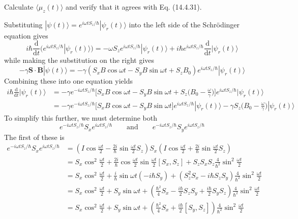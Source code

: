 \documentclass[../principles-of-quantum-mechanics.tex]{subfiles}
\begin{document}
\begin{questions}
		Calculate $\langle \mu_z(t)\rangle$ and verify that it agrees with Eq. (14.4.31).
		
		\begin{solution}
			Substituting $|\psi(t)\rangle = e^{i\omega tS_z/\hbar}|\psi_r(t)\rangle$ into the left side of the Schr\"odinger equation gives
			$$i\hbar\frac{\mathrm{d}}{\mathrm{d}t}\Big(e^{i\omega tS_z/\hbar}|\psi_r(t)\rangle\Big) = -\omega S_ze^{i\omega tS_z/\hbar}|\psi_r(t)\rangle + i\hbar e^{i\omega tS_z/\hbar}\frac{\mathrm{d}}{\mathrm{d}t}|\psi_r(t)\rangle$$
			while making the substitution on the right gives
			$$-\gamma\mathbf{S}\cdot\mathbf{B}|\psi(t)\rangle = -\gamma(S_xB\cos\omega t - S_yB\sin\omega t + S_zB_0)e^{i\omega tS_z/\hbar}|\psi_r(t)\rangle$$
			Combining these into one equation yields
			\begin{align*}
				i\hbar\frac{\mathrm{d}}{\mathrm{d}t}|\psi_r(t)\rangle &= -\gamma e^{-i\omega tS_z/\hbar}\Big[S_xB\cos\omega t - S_yB\sin\omega t + S_z\Big(B_0 - \frac{\omega}{\gamma}\Big)\Big]e^{i\omega tS_z/\hbar}|\psi_r(t)\rangle \\
				&= -\gamma e^{-i\omega tS_z/\hbar}\Big[S_xB\cos\omega t - S_yB\sin\omega t\Big]e^{i\omega tS_z/\hbar}|\psi_r(t)\rangle - \gamma S_z\Big(B_0 - \frac{\omega}{\gamma}\Big)|\psi_r(t)\rangle
			\end{align*}
			To simplify this further, we must determine both
			$$e^{-i\omega tS_z/\hbar}S_xe^{i\omega tS_z/\hbar}\qquad\text{and}\qquad e^{-i\omega tS_z/\hbar}S_ye^{i\omega tS_z/\hbar}$$
			The first of these is
			\begin{align*}
				e^{-i\omega tS_z/\hbar}S_xe^{i\omega tS_z/\hbar} &= (I\cos\tfrac{\omega t}{2} - \tfrac{2i}{\hbar}\sin\tfrac{\omega t}{2}S_z)S_x(I\cos\tfrac{\omega t}{2} + \tfrac{2i}{\hbar}\sin\tfrac{\omega t}{2}S_z) \\
				&= S_x\cos^2\tfrac{\omega t}{2} + \tfrac{2i}{\hbar}\cos\tfrac{\omega t}{2}\sin\tfrac{\omega t}{2}[S_x, S_z] +  S_zS_xS_z\tfrac{4}{\hbar^2}\sin^2\tfrac{\omega t}{2} \\
				&= S_x\cos^2\tfrac{\omega t}{2} + \frac{i}{\hbar}\sin\omega t(-i\hbar S_y) + (S_z^2S_x - i\hbar S_zS_y)\tfrac{4}{\hbar^2}\sin^2\tfrac{\omega t}{2} \\
				&= S_x\cos^2\tfrac{\omega t}{2} + S_y\sin\omega t + (\tfrac{\hbar^2}{4}S_x - \tfrac{i\hbar}{2}S_zS_y + \tfrac{i\hbar}{2}S_yS_z)\tfrac{4}{\hbar^2}\sin^2\tfrac{\omega t}{2} \\
				&= S_x\cos^2\tfrac{\omega t}{2} + S_y\sin\omega t + (\tfrac{\hbar^2}{4}S_x + \tfrac{i\hbar}{2}[S_y, S_z])\tfrac{4}{\hbar^2}\sin^2\tfrac{\omega t}{2} \\

\end{align*}
\end{solution}
\end{questions}
\end{document}
